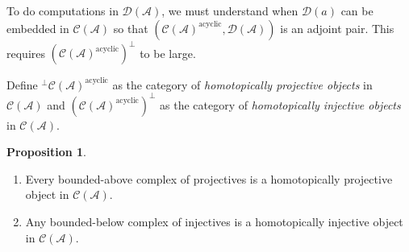 \documentclass[10pt,letterpaper,cm]{nupset}
\theoremstyle{definition}
\theoremstyle{theorem}
\newtheorem{prop}[definition]{Proposition}
\theoremstyle{remark}
\newcommand{\D}{\mathcal{D}}
\newcommand{\1}{\mathbf{1}}
\renewcommand{\a}{\mathscr{A}}
\newcommand{\0}{\vec 0}
\DeclareMathOperator{\acyc}{acyclic}
\begin{document}
To do computations in $\D(\a)$, we must understand when $\D(a)$ can be embedded in $\mathcal{C}(\a)$ so that $\left(\mathcal{C}(\a)^{\acyc}, \D(\a)\right)$ is an adjoint pair. This requires $\left(\mathcal{C}(\a)^{\acyc}\right)^{\perp}$  to be large. 

\medskip

Define ${^{\perp}{\mathcal{C}(\a)^{\acyc}}}$ as the category of \textit{homotopically projective objects} in $\mathcal{C}(\a)$ and $\left(\mathcal{C}(\a)^{\acyc}\right)^{\perp}$ as the category of \textit{homotopically injective objects} in $\mathcal{C}(\a)$. 


\begin{prop} $ $
\begin{enumerate}
\item Every bounded-above complex of projectives is a homotopically projective object in $\mathcal{C}(\a)$.
\item Any bounded-below complex of injectives is a homotopically injective object in $\mathcal{C}(\a)$. 
\end{enumerate}
\end{prop}
\end{document}

